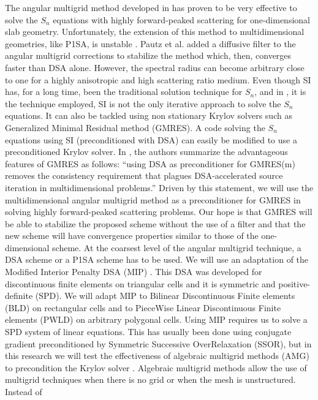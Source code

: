 The angular multigrid method developed in \cite{multigrid_1d} has proven to 
be very effective to solve the $S_n$ equations with highly forward-peaked 
scattering for one-dimensional slab geometry. Unfortunately, the extension 
of this method to multidimensional geometries, like P1SA, is unstable 
\cite{multigrid_2d}. Pautz et al. added a diffusive filter to the angular 
multigrid corrections to stabilize the method which, then, converges faster 
than DSA alone. However, 
the spectral radius can become arbitrary close to one for a highly anisotropic 
and high scattering ratio medium. Even though SI has, for a long time, been
the traditional solution technique for $S_n$, and in
\cite{multigrid_1d,multigrid_2d}, it is the technique employed, SI is not the
only iterative approach to solve the $S_n$ equations. It can also be tackled
using non stationary Krylov solvers such as Generalized Minimal Residual 
method (GMRES). A code solving the $S_n$ equations using SI (preconditioned 
with DSA) can easily be modified to use a preconditioned Krylov 
solver. In \cite{ttg}, the authors summarize the advantageous features of 
GMRES as follows: ``using DSA as preconditioner for GMRES(m) removes the 
consistency requirement that plagues DSA-accelerated source iteration in 
multidimensional problems.'' Driven by this statement, we will use the 
multidimensional angular multigrid method as a preconditioner for GMRES in 
solving highly forward-peaked scattering problems. Our hope is
that GMRES will be able to stabilize the proposed scheme without the use of a
filter and that the new scheme will have convergence properties similar to
those of the one-dimensional scheme. At the coarsest level of the angular
multigrid technique, a DSA 
scheme or a P1SA scheme has to be used. We will use an adaptation of the Modified 
Interior Penalty DSA (MIP) \cite{mip}. This DSA was developed for discontinuous 
finite elements on triangular cells and it is symmetric and positive-definite
(SPD). We will adapt MIP to Bilinear Discontinuous Finite elements (BLD) on 
rectangular cells and to PieceWise Linear Discontinuous Finite elements (PWLD) 
\cite{pwld_3d,pwld_2d} on arbitrary polygonal cells. Using MIP requires us to 
solve a SPD system of linear equations. This has 
usually been done using conjugate gradient preconditioned by Symmetric
Successive OverRelaxation (SSOR), but in this research we will test the 
effectiveness of algebraic multigrid methods (AMG) to precondition the Krylov solver 
\cite{amg,amg_course}. Algebraic multigrid methods allow the use of multigrid
techniques when there is no grid or when the mesh is unstructured. Instead of
